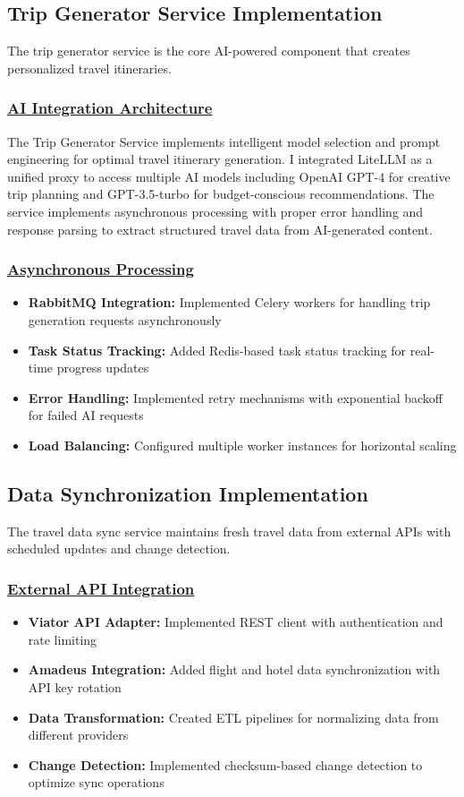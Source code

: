 \subsection{Trip Generator Service Implementation}
The trip generator service is the core AI-powered component that creates personalized travel itineraries.

\subsubsection*{\underline{AI Integration Architecture}}
The Trip Generator Service implements intelligent model selection and prompt engineering for optimal travel itinerary generation. I integrated LiteLLM as a unified proxy to access multiple AI models including OpenAI GPT-4 for creative trip planning and GPT-3.5-turbo for budget-conscious recommendations. The service implements asynchronous processing with proper error handling and response parsing to extract structured travel data from AI-generated content.

\subsubsection*{\underline{Asynchronous Processing}}
\begin{itemize}
    \item \textbf{RabbitMQ Integration:} Implemented Celery workers for handling trip generation requests asynchronously
    \item \textbf{Task Status Tracking:} Added Redis-based task status tracking for real-time progress updates
    \item \textbf{Error Handling:} Implemented retry mechanisms with exponential backoff for failed AI requests
    \item \textbf{Load Balancing:} Configured multiple worker instances for horizontal scaling
\end{itemize}

\subsection{Data Synchronization Implementation}
The travel data sync service maintains fresh travel data from external APIs with scheduled updates and change detection.

\subsubsection*{\underline{External API Integration}}
\begin{itemize}
    \item \textbf{Viator API Adapter:} Implemented REST client with authentication and rate limiting
    \item \textbf{Amadeus Integration:} Added flight and hotel data synchronization with API key rotation
    \item \textbf{Data Transformation:} Created ETL pipelines for normalizing data from different providers
    \item \textbf{Change Detection:} Implemented checksum-based change detection to optimize sync operations
\end{itemize}

